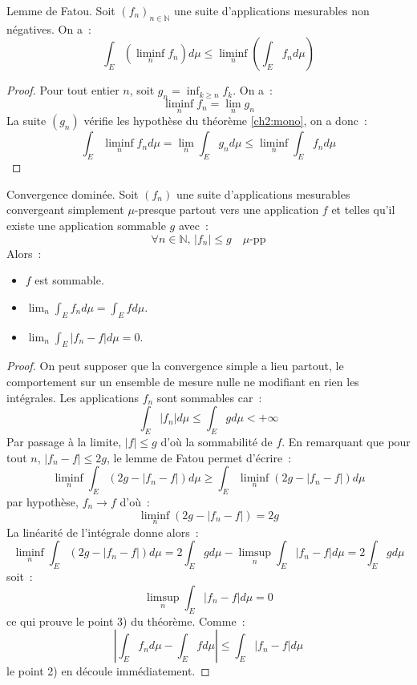 \begin{mandatory}
\begin{theorem}\label{ch2:fatou} Lemme de Fatou.
Soit $(f_n)_{n \in \mathbb{N}}$ une suite d'applications mesurables non
  négatives. On a~:
\[
\int_E (\liminf_n f_n) d \mu \leq \liminf_n \left(\int_E f_n d \mu \right)
\]
\end{theorem}
\end{mandatory}
\begin{proof}
Pour tout entier $n$, soit $g_n = \inf_{k \geq n} f_k$. On a~:
\[
\liminf_n f_n = \lim_n g_n
\]
La suite $(g_n)$ vérifie les hypothèse du théorème \ref{ch2:mono}, on
a donc~:
\[
\int_E \liminf_n f_n d\mu = \lim_n \int_E g_n d\mu \leq \liminf_n
\int_E f_n d \mu
\]
\end{proof}
\begin{mandatory}
\begin{theorem}\label{ch2:domi} Convergence dominée.
Soit $(f_n)$ une suite d'applications mesurables convergeant
 simplement $\mu$-presque partout vers une application
$f$ et telles qu'il existe
une application sommable $g$ avec~:
\[
\forall n \in \mathbb{N}, \, |f_n| \leq g \quad \mu\text{-pp}
\]
Alors~:
\begin{itemize}
\item $f$ est sommable.
\item $\lim_n \int_E f_n d\mu  = \int_E f d\mu$.
\item $\lim_n \int_E |f_n -f | d \mu = 0$.
\end{itemize}
\end{theorem}
\end{mandatory}
\begin{proof}
On peut supposer que la convergence simple a lieu partout, le
comportement sur un ensemble de mesure nulle ne modifiant en rien les
intégrales. 
Les applications $f_n$ sont sommables car~:
 \[\int_E |f_n| d \mu \leq
\int_E g d \mu < +\infty \]
Par passage à la limite, $|f| \leq g$ d'où la sommabilité de $f$.
En remarquant que pour tout $n$, $|f_n - f| \leq 2g$, le lemme de
Fatou permet d'écrire~:
\[
\liminf_n \int_E (2g -|f_n-f|) d \mu \geq \int_E \liminf_n (2g - |f_n-f|)
d \mu
\]
par hypothèse, $f_n \to f$ d'où~:
\[
 \liminf_n \left (2g - |f_n-f| \right ) = 2g
\]
La linéarité de l'intégrale donne alors~:
\[
\liminf_n \int_E (2g -|f_n-f|) d \mu = 2 \int_E g d \mu - \limsup_n
\int_E |f_n-f| d \mu = 2 \int_E g d \mu
\]
soit~:
\[
 \limsup_n \int_E |f_n-f| d \mu = 0
\]
ce qui prouve le point 3) du théorème.
Comme~:
\[
\left | \int_E f_n d \mu - \int_E f d \mu \right | \leq \int_E |f_n
-f| d \mu
\]
le point 2) en découle immédiatement.
\end{proof}
